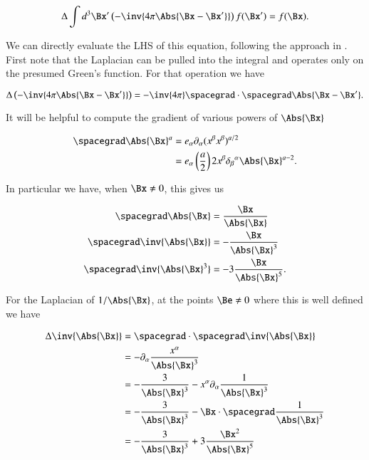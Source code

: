 \begin{equation}\label{eqn:relativisticElectrodynamicsL18:133}
\Delta \int d^3 \Bx' \left(-\inv{4 \pi \Abs{\Bx - \Bx'} } \right) f(\Bx') = f(\Bx).
\end{equation}

We can directly evaluate the LHS of this equation, following the approach in \citep{schwartz1987pe}.  First note that the Laplacian can be pulled into the integral and operates only on the presumed Green's function.  For that operation we have

\begin{equation}\label{eqn:relativisticElectrodynamicsL18:134}
\Delta \left(-\inv{4 \pi \Abs{\Bx - \Bx'} } \right)
=
-\inv{4 \pi} \spacegrad \cdot \spacegrad \Abs{\Bx - \Bx'}.
\end{equation}

It will be helpful to compute the gradient of various powers of $\Abs{\Bx}$

\begin{align*}
\spacegrad \Abs{\Bx}^a
&=
e_\alpha \partial_\alpha (x^\beta x^\beta)^{a/2} \\
&=
e_\alpha \left(\frac{a}{2}\right) 2 x^\beta {\delta_\beta}^\alpha \Abs{\Bx}^{a - 2}.
\end{align*}

In particular we have, when $\Bx \ne 0$, this gives us

\begin{align}\label{eqn:relativisticElectrodynamicsL18:135}
\spacegrad \Abs{\Bx} &= \frac{\Bx}{\Abs{\Bx}} \\
\spacegrad \inv{\Abs{\Bx}} &= -\frac{\Bx}{\Abs{\Bx}^3} \\
\spacegrad \inv{\Abs{\Bx}^3} &= -3 \frac{\Bx}{\Abs{\Bx}^5}.
\end{align}

For the Laplacian of $1/\Abs{\Bx}$, at the points $\Be \ne 0$ where this is well defined we have

\begin{align*}
\Delta \inv{\Abs{\Bx}} 
&=
\spacegrad \cdot \spacegrad \inv{\Abs{\Bx}} \\
&= 
-\partial_\alpha \frac{x^\alpha}{\Abs{\Bx}^3} \\
&= 
-\frac{3}{\Abs{\Bx}^3} 
- x^\alpha \partial_\alpha \frac{1}{\Abs{\Bx}^3} \\
&= 
-\frac{3}{\Abs{\Bx}^3} 
- \Bx \cdot \spacegrad \frac{1}{\Abs{\Bx}^3} \\
&= 
-\frac{3}{\Abs{\Bx}^3} 
+ 3 \frac{\Bx^2}{\Abs{\Bx}^5}
\end{align*}

